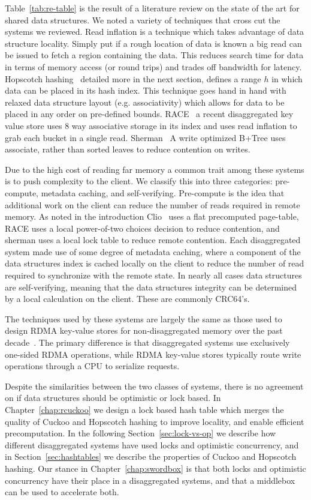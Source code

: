 \documentclass[12pt]{ucsddissertation}
\begin{document}
Table~\ref{tab:re-table} is the result of a literature review on the state of the art for shared
data structures. We noted a variety of techniques that cross cut the systems we reviewed. Read
inflation is a technique which takes advantage of data structure locality. Simply put if a rough
location of data is known a big read can be issued to fetch a region containing the data. This
reduces search time for data in terms of memory access (or round trips) and trades off bandwidth for
latency. Hopscotch hashing~\cite{hopscotch} detailed more in the next section, defines a range $h$
in which data can be placed in its hash index. This technique goes hand in hand with relaxed data
structure layout (e.g. associativity) which allows for data to be placed in any order on pre-defined
bounds. RACE~\cite{race} a recent disaggregated key value store uses 8 way associative storage in
its index and uses read inflation to grab each bucket in a single read. Sherman~\cite{sherman} A
write optimized B+Tree uses associate, rather than sorted leaves to reduce contention on writes.

Due to the high cost of reading far memory a common trait among these systems is to push complexity
to the client. We classify this into three categories: pre-compute, metadata caching, and
self-verifying. Pre-compute is the idea that additional work on the client can reduce the number of
reads required in remote memory. As noted in the introduction Clio~\cite{clio} uses a flat
precomputed page-table, RACE uses a local power-of-two choices decision to reduce contention, and
sherman uses a local lock table to reduce remote contention. Each disaggregated system made use of
some degree of metadata caching, where a component of the data structures index is cached locally on
the client to reduce the number of read required to synchronize with the remote state. In nearly all
cases data structures are self-verifying, meaning that the data structures integrity can be
determined by a local calculation on the client. These are commonly CRC64's.

The techniques used by these systems are largely the same as those used to design RDMA key-value
stores for non-disaggregated memory over the past decade~\cite{pilaf,cell,herd,farm}. The primary
difference is that disaggregated systems use exclusively one-sided RDMA operations, while RDMA
key-value stores typically route write operations through a CPU to serialize requests.

Despite the similarities between the two classes of systems, there is no agreement on if data
structures should be optimistic or lock based. 
In Chapter~\ref{chap:rcuckoo} we design a lock based hash table which merges the quality of Cuckoo
and Hopscotch hashing to improve locality, and enable efficient precomputation. In the following
Section~\ref{sec:lock-vs-op} we describe how different disaggregated systems have used locks and
optimistic concurrency, and in Section~\ref{sec:hashtables} we describe the properties of Cuckoo and
Hopscotch hashing.
Our stance in Chapter~\ref{chap:swordbox} is that both locks and optimistic concurrency have their
place in a disaggregated systems, and that a middlebox can be used to accelerate both. 
\end{document}
